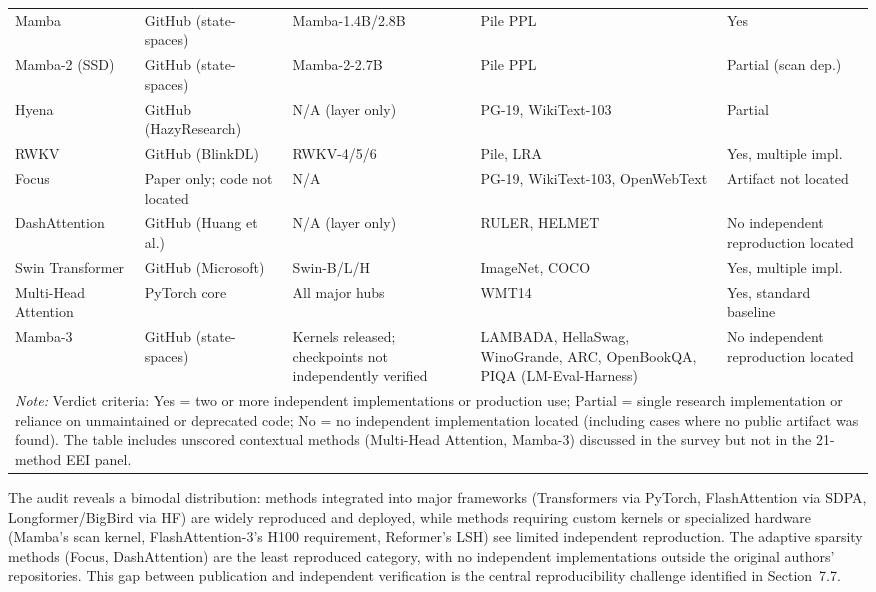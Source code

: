 \documentclass[10pt,twocolumn]{article}
\begin{document}
\begin{table}[!tbp]
\begin{tabular}{p{1.8cm}p{2.0cm}p{2.0cm}p{2.2cm}p{1.6cm}}
Mamba & GitHub (state-spaces) & Mamba-1.4B/2.8B & Pile PPL & Yes \\
Mamba-2 (SSD) & GitHub (state-spaces) & Mamba-2-2.7B & Pile PPL & Partial (scan dep.) \\
Hyena & GitHub (HazyResearch) & N/A (layer only) & PG-19, WikiText-103 & Partial \\
RWKV & GitHub (BlinkDL) & RWKV-4/5/6 & Pile, LRA & Yes, multiple impl. \\
Focus & Paper only; code not located & N/A & PG-19, WikiText-103, OpenWebText & Artifact not located \\
DashAttention & GitHub (Huang et al.) & N/A (layer only) & RULER, HELMET & No independent reproduction located \\
Swin Transformer & GitHub (Microsoft) & Swin-B/L/H & ImageNet, COCO & Yes, multiple impl. \\
Multi-Head Attention & PyTorch core & All major hubs & WMT14 & Yes, standard baseline \\
Mamba-3 & GitHub (state-spaces) & Kernels released; checkpoints not independently verified & LAMBADA, HellaSwag, WinoGrande, ARC, OpenBookQA, PIQA (LM-Eval-Harness) & No independent reproduction located \\
\bottomrule
\multicolumn{5}{p{\dimexpr1.8cm+2.0cm+2.0cm+2.2cm+1.6cm+10\tabcolsep\relax}}{\scriptsize \textit{Note:} Verdict criteria: Yes = two or more independent implementations or production use; Partial = single research implementation or reliance on unmaintained or deprecated code; No = no independent implementation located (including cases where no public artifact was found). The table includes unscored contextual methods (Multi-Head Attention, Mamba-3) discussed in the survey but not in the 21-method EEI panel.} \\
\end{tabular}
\end{table}

\noindent The audit reveals a bimodal distribution: methods integrated into major frameworks (Transformers via PyTorch, FlashAttention via SDPA, Longformer/BigBird via HF) are widely reproduced and deployed, while methods requiring custom kernels or specialized hardware (Mamba's scan kernel, FlashAttention-3's H100 requirement, Reformer's LSH) see limited independent reproduction. The adaptive sparsity methods (Focus, DashAttention) are the least reproduced category, with no independent implementations outside the original authors' repositories. This gap between publication and independent verification is the central reproducibility challenge identified in Section~7.7.
\end{document}
